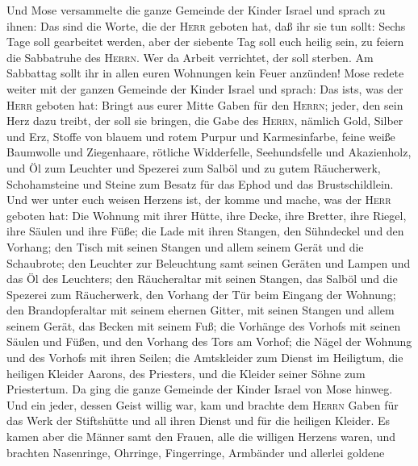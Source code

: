  Und Mose versammelte die ganze Gemeinde der Kinder Israel
und sprach zu ihnen: Das sind die Worte, die der \textsc{Herr} geboten
hat, daß ihr sie tun sollt:  Sechs Tage soll gearbeitet
werden, aber der siebente Tag soll euch heilig sein, zu feiern die
Sabbatruhe des \textsc{Herrn}. Wer da Arbeit verrichtet, der soll
sterben.  Am Sabbattag sollt ihr in allen euren Wohnungen
kein Feuer anzünden!  Mose redete weiter mit der ganzen
Gemeinde der Kinder Israel und sprach: Das ist\textquotesingle s, was
der \textsc{Herr} geboten hat:  Bringt aus eurer Mitte
Gaben für den \textsc{Herrn}; jeder, den sein Herz dazu treibt, der soll
sie bringen, die Gabe des \textsc{Herrn}, nämlich Gold, Silber und Erz,
 Stoffe von blauem und rotem Purpur und Karmesinfarbe,
feine weiße Baumwolle und Ziegenhaare,  rötliche
Widderfelle, Seehundsfelle und Akazienholz,  und Öl zum
Leuchter und Spezerei zum Salböl und zu gutem Räucherwerk,
 Schohamsteine und Steine zum Besatz für das Ephod und das
Brustschildlein.  Und wer unter euch weisen Herzens ist,
der komme und mache, was der \textsc{Herr} geboten hat: 
Die Wohnung mit ihrer Hütte, ihre Decke, ihre Bretter, ihre Riegel, ihre
Säulen und ihre Füße;  die Lade mit ihren Stangen, den
Sühndeckel und den Vorhang;  den Tisch mit seinen Stangen
und allem seinem Gerät und die Schaubrote;  den Leuchter
zur Beleuchtung samt seinen Geräten und Lampen und das Öl des Leuchters;
 den Räucheraltar mit seinen Stangen, das Salböl und die
Spezerei zum Räucherwerk, den Vorhang der Tür beim Eingang der Wohnung;
 den Brandopferaltar mit seinem ehernen Gitter, mit
seinen Stangen und allem seinem Gerät, das Becken mit seinem Fuß;
 die Vorhänge des Vorhofs mit seinen Säulen und Füßen,
und den Vorhang des Tors am Vorhof;  die Nägel der
Wohnung und des Vorhofs mit ihren Seilen;  die
Amtskleider zum Dienst im Heiligtum, die heiligen Kleider Aarons, des
Priesters, und die Kleider seiner Söhne zum Priestertum. 
Da ging die ganze Gemeinde der Kinder Israel von Mose hinweg.
 Und ein jeder, dessen Geist willig war, kam und brachte
dem \textsc{Herrn} Gaben für das Werk der Stiftshütte und all ihren
Dienst und für die heiligen Kleider.  Es kamen aber die
Männer samt den Frauen, alle die willigen Herzens waren, und brachten
Nasenringe, Ohrringe, Fingerringe, Armbänder und allerlei goldene
